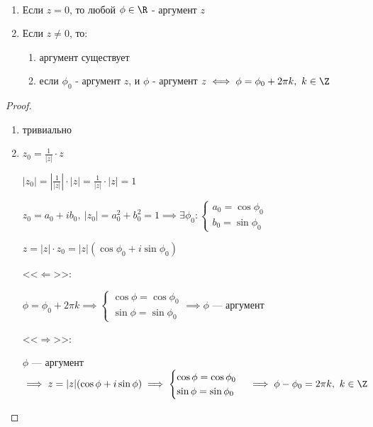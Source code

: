 \begin{theorem-non}~
    \begin{enumerate}
        \item Если $z = 0$, то любой $\phi \in \R$ - аргумент $z$
        
        \item Если $z \neq 0$, то:
        \begin{enumerate}
            \item аргумент существует
            
            \item если $\phi_0$ - аргумент $z$, и $\phi$ - аргумент $z \iff \phi = \phi_0 + 2 \pi k,~k \in \Z$
        \end{enumerate}
    \end{enumerate}
\end{theorem-non}

\begin{proof}
    \begin{enumerate}
        \item тривиально
        
        \item $z_0 = \frac{1}{|z|} \cdot z$ 
        
        $|z_0| = \left| \frac{1}{|z|} \right| \cdot |z| = \frac{1}{|z|} \cdot |z| = 1$
        
        $z_0 = a_0 + ib_0,~|z_0| = a_0^2 + b_0^2 = 1 \implies \exists \phi_0:
        \begin{cases}
            a_0 = \cos\phi_0\\
            b_0 = \sin\phi_0
        \end{cases}$

        $z = |z| \cdot z_0 = |z|(\cos\phi_0 + i\sin\phi_0)$

       <<$\Leftarrow$>>: 

        $\phi = \phi_0 + 2 \pi k \implies
        \begin{cases}
            \cos\phi = \cos\phi_0\\
            \sin\phi = \sin\phi_0
        \end{cases} \implies \phi$ --- аргумент

        <<$\Rightarrow$>>:

        $\phi$ --- аргумент $\implies z = |z|(\cos\phi + i\sin\phi) \implies
        \begin{cases}
            \cos\phi = \cos\phi_0\\
            \sin\phi = \sin\phi_0
        \end{cases} \implies \phi - \phi_0 = 2 \pi k,~k \in \Z$
    \end{enumerate}
\end{proof}

